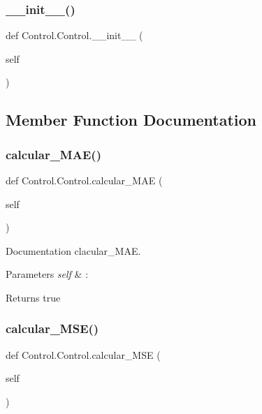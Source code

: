 \subsubsection{\texorpdfstring{\+\_\+\+\_\+init\+\_\+\+\_\+()}{\_\_init\_\_()}}
{\footnotesize\ttfamily def Control.\+Control.\+\_\+\+\_\+init\+\_\+\+\_\+ (\begin{DoxyParamCaption}\item[{}]{self }\end{DoxyParamCaption})}



\subsection{Member Function Documentation}
\mbox{\label{class_control_1_1_control_a01b94321309bbd777b1d147559ba8163}} 
\subsubsection{\texorpdfstring{calcular\+\_\+\+M\+A\+E()}{calcular\_MAE()}}
{\footnotesize\ttfamily def Control.\+Control.\+calcular\+\_\+\+M\+AE (\begin{DoxyParamCaption}\item[{}]{self }\end{DoxyParamCaption})}



Documentation clacular\+\_\+\+M\+AE. 


\begin{DoxyParams}{Parameters}
{\em self} & \+: \\
\hline
\end{DoxyParams}
\begin{DoxyReturn}{Returns}
true 
\end{DoxyReturn}
\mbox{\label{class_control_1_1_control_ae634564c3406e0fe8fe8cc1e53f8a924}} 
\subsubsection{\texorpdfstring{calcular\+\_\+\+M\+S\+E()}{calcular\_MSE()}}
{\footnotesize\ttfamily def Control.\+Control.\+calcular\+\_\+\+M\+SE (\begin{DoxyParamCaption}\item[{}]{self }\end{DoxyParamCaption})}



